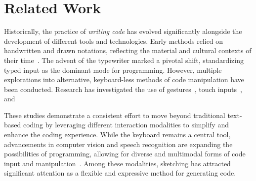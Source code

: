
 
 


\section{Related Work}
Historically, the practice of \textit{writing code} has evolved significantly alongside the development of different tools and technologies. Early methods relied on handwritten and drawn notations, reflecting the material and cultural contexts of their time~\cite{arawjo_write_2020}. 
The advent of the typewriter marked a pivotal shift, standardizing typed input as the dominant mode for programming.
However, multiple explorations into alternative, keyboard-less methods of code manipulation have been conducted. Research has investigated the use of gestures~\cite{murphy2011restructuring}, touch inputs~\cite{tillmann2012touchdevelop, raab_refactorpad_2013, 10.1145/1879211.1879217}, and 




These studies demonstrate a consistent effort to move beyond traditional text-based coding by leveraging different interaction modalities to simplify and enhance the coding experience.
While the keyboard remains a central tool, advancements in computer vision and speech recognition are expanding the possibilities of programming, allowing for diverse and multimodal forms of code input and manipulation~\cite{pollock2024designing, horowitz2023live}.
Among these modalities, sketching has attracted significant attention as a flexible and expressive method for generating code.


